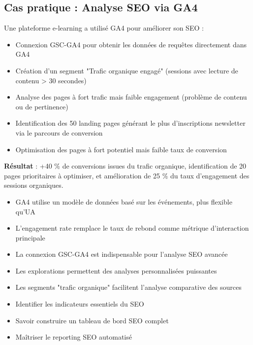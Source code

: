 \documentclass[12pt,a4paper,twoside]{report}
\newcommand{\level}[1]{\medskip\bigskip}
\begin{document}
\subsection{Cas pratique : Analyse SEO via GA4}

Une plateforme e-learning a utilisé GA4 pour améliorer son SEO :
\begin{itemize}
    \item Connexion GSC-GA4 pour obtenir les données de requêtes directement dans GA4
    \item Création d'un segment "Trafic organique engagé" (sessions avec lecture de contenu > 30 secondes)
    \item Analyse des pages à fort trafic mais faible engagement (problème de contenu ou de pertinence)
    \item Identification des 50 landing pages générant le plus d'inscriptions newsletter via le parcours de conversion
    \item Optimisation des pages à fort potentiel mais faible taux de conversion
\end{itemize}
\textbf{Résultat} : +40 \% de conversions issues du trafic organique, identification de 20 pages prioritaires à optimiser, et amélioration de 25 \% du taux d'engagement des sessions organiques.

\begin{takeaways}
\begin{itemize}
    \item GA4 utilise un modèle de données basé sur les événements, plus flexible qu'UA
    \item L'engagement rate remplace le taux de rebond comme métrique d'interaction principale
    \item La connexion GSC-GA4 est indispensable pour l'analyse SEO avancée
    \item Les explorations permettent des analyses personnalisées puissantes
    \item Les segments "trafic organique" facilitent l'analyse comparative des sources
\end{itemize}
\end{takeaways}

\level{2}
\begin{objectives}
\begin{itemize}
    \item Identifier les indicateurs essentiels du SEO
    \item Savoir construire un tableau de bord SEO complet
    \item Maîtriser le reporting SEO automatisé
\end{itemize}
\end{objectives}
\end{document}
